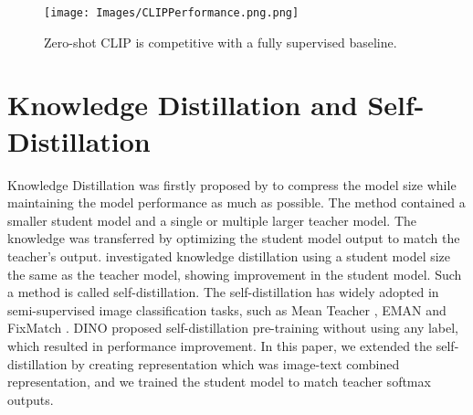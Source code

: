 \begin{figure}[h]
    \label{fig:clip-performance}
    \caption{Zero-shot CLIP is competitive with a fully supervised baseline.}
    \centering
    \texttt{[image: Images/CLIPPerformance.png.png]}
    \small
\end{figure}

\section{Knowledge Distillation and Self-Distillation}
Knowledge Distillation was firstly proposed by  to compress the model size while maintaining the model performance as much as possible.
The method contained a smaller student model and a single or multiple larger teacher model.
The knowledge was transferred by optimizing the student model output to match the teacher's output.
 investigated knowledge distillation using a student model size the same as the teacher model, showing improvement in the student model.
Such a method is called self-distillation.
The self-distillation has widely adopted in semi-supervised image classification tasks, such as Mean Teacher , EMAN  and FixMatch .
DINO  proposed self-distillation pre-training without using any label, which resulted in performance improvement.
In this paper, we extended the self-distillation by creating representation which was image-text combined representation, and we trained the student model to match teacher softmax outputs.



